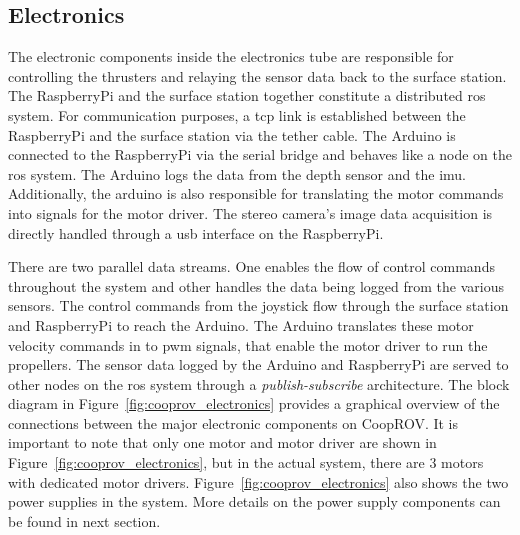 \subsection{Electronics}

The electronic components inside the electronics tube are responsible for controlling the thrusters and relaying the sensor data back to the surface station. The RaspberryPi and the surface station together constitute a distributed \gls{ros} system. For communication purposes, a \gls{tcp} link is established between the RaspberryPi and the surface station via the tether cable. The Arduino is connected to the RaspberryPi via the serial bridge and behaves like a node on the \gls{ros} system. The Arduino logs the data from the depth sensor and the \gls{imu}. Additionally, the arduino is also responsible for translating the motor commands into signals for the motor driver. The stereo camera's image data acquisition is directly handled through a usb interface on the RaspberryPi.

There are two parallel data streams. One enables the flow of control commands throughout the system and other handles the data being logged from the various sensors. The control commands from the joystick flow through the surface station and RaspberryPi to reach the Arduino. The Arduino translates these motor velocity commands in to \gls{pwm} signals, that enable the motor driver to run the propellers. The sensor data logged by the Arduino and RaspberryPi are served to other nodes on the \gls{ros} system through a \emph{publish-subscribe} architecture. The block diagram in Figure~\ref{fig:cooprov_electronics} provides a graphical overview of the connections between the major electronic components on CoopROV. It is important to note that only one motor and motor driver are shown in Figure~\ref{fig:cooprov_electronics}, but in the actual system, there are 3 motors with dedicated motor drivers. Figure~\ref{fig:cooprov_electronics} also shows the two power supplies in the system. More details 
on the power supply components can be found in next section.

